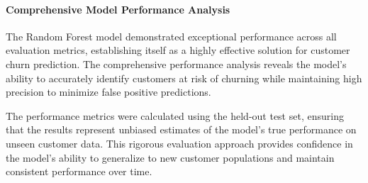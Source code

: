 \documentclass{article}
\begin{document}
\paragraph{Comprehensive Model Performance Analysis}

The Random Forest model demonstrated exceptional performance across all evaluation metrics, establishing itself as a highly effective solution for customer churn prediction. The comprehensive performance analysis reveals the model's ability to accurately identify customers at risk of churning while maintaining high precision to minimize false positive predictions.

The performance metrics were calculated using the held-out test set, ensuring that the results represent unbiased estimates of the model's true performance on unseen customer data. This rigorous evaluation approach provides confidence in the model's ability to generalize to new customer populations and maintain consistent performance over time.
\end{document}
